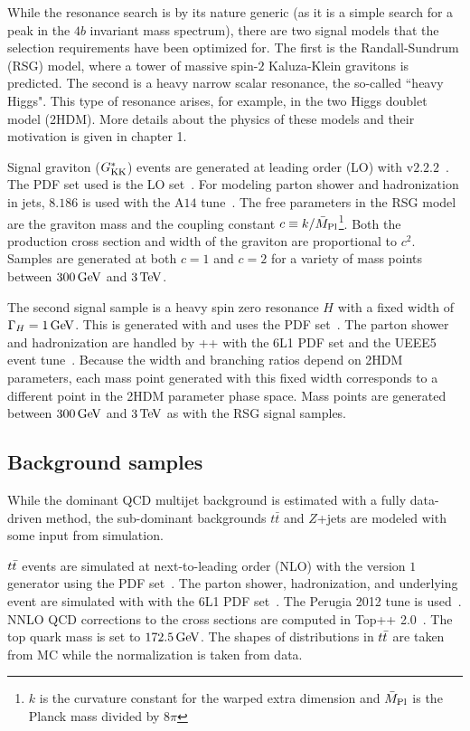 While the resonance search is by its nature generic (as it is a simple search for a peak in the $4b$ invariant mass spectrum), there are two signal models that the selection requirements have been optimized for. The first is the Randall-Sundrum (RSG) model, where a tower of massive spin-$2$ Kaluza-Klein gravitons is predicted. The second is a heavy narrow scalar resonance, the so-called ``heavy Higgs". This type of resonance arises, for example, in the two Higgs doublet model (2HDM). More details about the physics of these models and their motivation is given in chapter 1. 

Signal graviton ($G^*_{\rm KK}$) events are generated at leading order (LO) with  v$2.2.2$~\cite{MG5aMCatNLO}. The PDF set used is the  LO set~\cite{nnpdf}. For modeling parton shower and hadronization in jets, \PYTHIA $8.186$ is used with the A$14$ tune~\cite{pythia8,a14tune}. The free parameters in the RSG model are the graviton mass and the coupling constant $c \equiv k/\bar{M}_{\rm Pl}$\footnote{$k$ is the curvature constant for the warped extra dimension and $\bar{M}_{\rm Pl}$ is the Planck mass divided by $8\pi$}. Both the production cross section and width of the graviton are proportional to $c^2$. Samples are generated at both $c = 1$ and $c = 2$ for a variety of mass points between $300 \GeV$ and $3 \TeV$. 

The second signal sample is a heavy spin zero resonance $H$ with a fixed width of $\Gamma_H = 1 \GeV$. This is generated with  and uses the  PDF set~\cite{ct10}. The parton shower and hadronization are handled by \HERWIG++ with the \CTEQ6L1 PDF set and the UEEE5 event tune~\cite{HerwigPP,cteq,UEEE5}. Because the width and branching ratios depend on 2HDM parameters, each mass point generated with this fixed width corresponds to a different point in the 2HDM parameter phase space. Mass points are generated between $300 \GeV$ and $3 \TeV$ as with the RSG signal samples. 

\subsection{Background samples}

While the dominant QCD multijet background is estimated with a fully data-driven method, the sub-dominant backgrounds $t\bar{t}$ and $Z$+jets are modeled with some input from simulation.

$t\bar{t}$ events are simulated at next-to-leading order (NLO) with the \POWHEGBOX version $1$ generator using the  PDF set~\cite{PowhegBox}. The parton shower, hadronization, and underlying event are simulated with  with the \CTEQ6L1 PDF set~\cite{pythia6}. The Perugia 2012 tune is used~\cite{Perugia2012}. NNLO QCD corrections to the cross sections are computed in Top++ 2.0~\cite{TopPP}. The top quark mass is set to $172.5 \GeV$. The shapes of distributions in $t\bar{t}$ are taken from MC while the normalization is taken from data.


